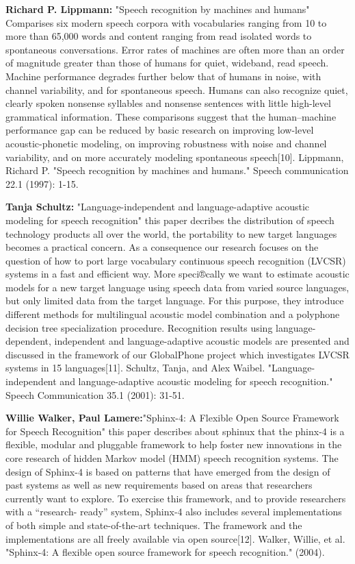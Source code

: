 \documentclass[12pt,a4paper,oldfontcommands]{memoir}
\begin{document}
\textbf{Richard P. Lippmann:} "Speech recognition by machines and humans" Comparises six modern speech corpora with vocabularies ranging from 10 to more than 65,000 words and content ranging from read isolated words to spontaneous conversations. Error rates of machines are often more than an order of magnitude greater than those of
humans for quiet, wideband, read speech. Machine performance degrades further below that of humans in noise, with
channel variability, and for spontaneous speech. Humans can also recognize quiet, clearly spoken nonsense syllables and
nonsense sentences with little high-level grammatical information. These comparisons suggest that the human–machine
performance gap can be reduced by basic research on improving low-level acoustic-phonetic modeling, on improving
robustness with noise and channel variability, and on more accurately modeling spontaneous speech[10].  Lippmann, Richard P. "Speech recognition by machines and humans." Speech communication 22.1 (1997): 1-15.

\textbf{Tanja Schultz:} "Language-independent and language-adaptive acoustic modeling for speech recognition" this paper decribes  the distribution of speech technology products all over the world, the portability to new target languages
becomes a practical concern. As a consequence our research focuses on the question of how to port large
vocabulary continuous speech recognition (LVCSR) systems in a fast and efficient way. More speci®cally we want
to estimate acoustic models for a new target language using speech data from varied source languages, but only
limited data from the target language. For this purpose, they introduce different methods for multilingual acoustic
model combination and a polyphone decision tree specialization procedure. Recognition results using language-
dependent, independent and language-adaptive acoustic models are presented and discussed in the framework of
our GlobalPhone project which investigates LVCSR systems in 15 languages[11].   Schultz, Tanja, and Alex Waibel. "Language-independent and language-adaptive acoustic modeling for speech recognition." Speech Communication 35.1 (2001): 31-51.

\textbf{Willie Walker, Paul Lamere:}"Sphinx-4: A Flexible Open Source Framework for Speech Recognition" this paper describes about sphinux that the phinx-4 is a flexible, modular and pluggable framework to help foster new innovations
in the core research of hidden Markov model (HMM) speech recognition systems. The
design of Sphinx-4 is based on patterns that have emerged from the design of past
systems as well as new requirements based on areas that researchers currently want
to explore. To exercise this framework, and to provide researchers with a “research-
ready” system, Sphinx-4 also includes several implementations of both simple and
state-of-the-art techniques. The framework and the implementations are all freely
available via open source[12].  Walker, Willie, et al. "Sphinx-4: A flexible open source framework for speech recognition." (2004).
\end{document}
